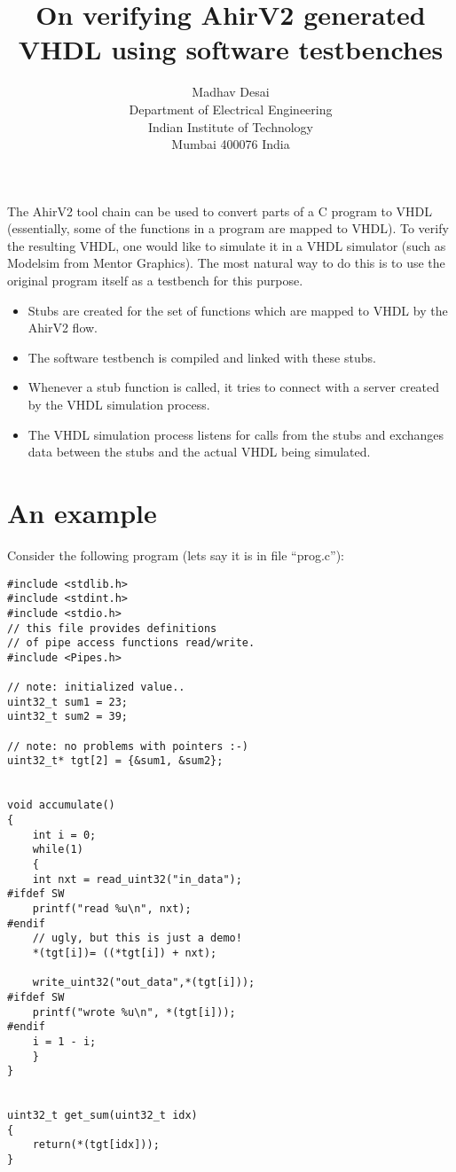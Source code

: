 \documentclass{article}
\title{On verifying AhirV2 generated VHDL using software testbenches}
\author{Madhav Desai \\ Department of Electrical Engineering \\ Indian Institute of Technology \\
	Mumbai 400076 India}
\begin{document}
\maketitle


The AhirV2 tool chain can be used to convert parts of a C program to VHDL
(essentially, some of the functions in a program are mapped to VHDL).
To verify the resulting VHDL, one would like to simulate it in a
VHDL simulator (such as Modelsim from Mentor Graphics).  The most
natural way to do this is to use the original program itself
as a testbench for this purpose.

\begin{itemize}
\item Stubs are created for the set of functions which are mapped to  
VHDL by the AhirV2 flow.
\item The software testbench is compiled and linked with these stubs.
\item Whenever a stub function is called, it tries to connect with
a server created by the VHDL simulation process.
\item The VHDL simulation process listens for calls from the stubs
and exchanges data between the stubs and the actual VHDL being simulated.
\end{itemize}


\section{An example}

Consider the following program (lets say it is in file ``prog.c''):
\begin{verbatim}
#include <stdlib.h>
#include <stdint.h>
#include <stdio.h>
// this file provides definitions
// of pipe access functions read/write.
#include <Pipes.h>

// note: initialized value..
uint32_t sum1 = 23;
uint32_t sum2 = 39;

// note: no problems with pointers :-)
uint32_t* tgt[2] = {&sum1, &sum2};


void accumulate()
{
    int i = 0;
    while(1)
    {
	int nxt = read_uint32("in_data");
#ifdef SW
	printf("read %u\n", nxt);
#endif
	// ugly, but this is just a demo!
	*(tgt[i])= ((*tgt[i]) + nxt);

	write_uint32("out_data",*(tgt[i]));
#ifdef SW
	printf("wrote %u\n", *(tgt[i]));
#endif
	i = 1 - i;
    }
}


uint32_t get_sum(uint32_t idx)
{
    return(*(tgt[idx]));
}

\end{verbatim}
\end{document}

